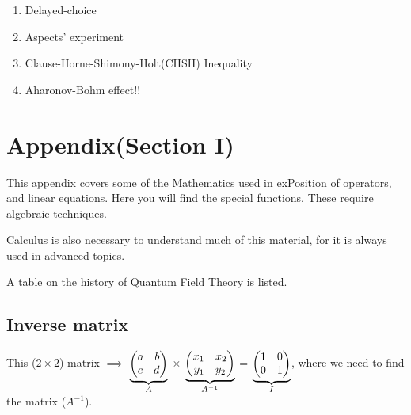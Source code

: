 \documentclass[a4paper, 10pt, onepage]{elegantbook}
\begin{document}
{\begin{enumerate}
Referring to Euler-Lagrange equation, Electrons of superconducting Energy devices comes in pairs($\Phi_0$ = 
$\frac{\hbar}{2e}$), known as \emph{COOPER PAIRS}. This represents the fundamental Constants(Plancks' Constant, and the 
Charge of the Electron).  


We then translate Kinetic Energy to Momentum Energy,where [$E_c$] is the Capacitive 
Energy[$\frac{e^2}{2c}$], and[ $E_j$], is the Josephsons' junction[$\frac{I_0 \Phi_0}{2 \pi}$], and magnetic flux 
quantization within a superconducting loop, cooled by liquid nitrogen at $77^\circ$K or $-196.1^\circ$C. 

\item Delayed-choice
\item Aspects' experiment
\item Clause-Horne-Shimony-Holt(CHSH) Inequality
\item Aharonov-Bohm effect!!
\end{enumerate}


\chapter{Appendix(Section I)}


\begin{remark}


This appendix covers some of the  Mathematics used in  exPosition of operators, and linear equations. Here you will 
find the special functions. These require algebraic techniques.  

Calculus is also necessary to understand much of this material, for it is always used in advanced topics.  

A table on the history of Quantum Field Theory is listed.  

\end{remark}

\section{Inverse matrix}

This ($2 \times 2$) matrix $\implies$ $\underbrace{\begin{pmatrix}a \quad b \cr c \quad d \end{pmatrix}}_{A}$ $\times$ 
$\underbrace{\begin{pmatrix}x_{1} \quad x_{2} \cr y_{1} \quad y_{2} \end{pmatrix}}_{A^{-1}}$ = 
$\underbrace{\begin{pmatrix}1 \quad 0 \cr 0 \quad 1 \end{pmatrix}}_{I}$, where we need to find the matrix (${A^{-1}}$). 
 \\

}
\end{document}
